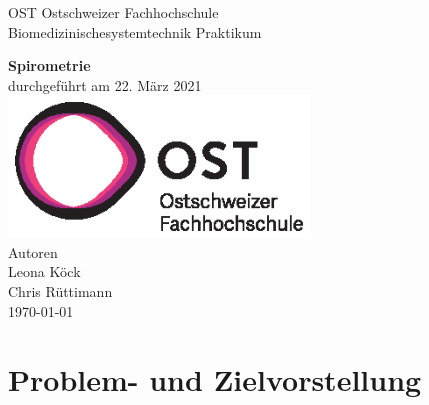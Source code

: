\documentclass[11pt]{scrartcl}
\begin{document}
    \begin{titlepage}
        \begin{center}
        {\LARGE OST Ostschweizer Fachhochschule}
            \\[1.5cm]
            \linespread{1.2}\large { Biomedizinischesystemtechnik Praktikum }

            \huge{\bfseries Spirometrie}
            \\%
            \large{durchgef{\"u}hrt am 22. März 2021}
            \\[1.5cm]
           \includegraphics[width=8cm]{../images/ost_logo.eps}
           \\[1cm]
            {\small{Autoren}}\\
            {\Large{Leona K{\"o}ck}}\\
            {\Large{Chris R{\"u}ttimann}}
            \\[1cm]

            \vspace*{\fill}
            \large{\today}
        \end{center}

    \end{titlepage}

    \addtocounter{section}{0}

    \tableofcontents
    \pagebreak



    \section{Problem- und Zielvorstellung}
   
\end{document}
